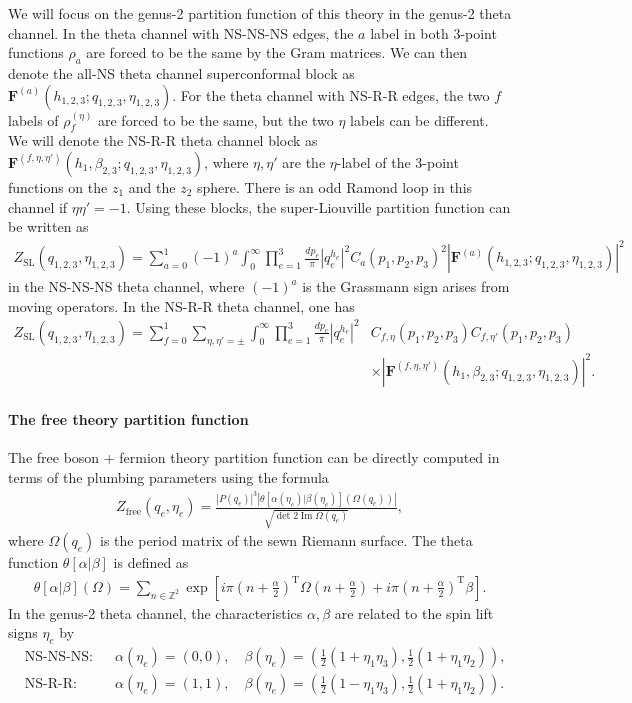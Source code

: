 \documentclass[12pt]{article}
\def\ie{\begin{equation}\begin{aligned}}
\def\fe{\end{aligned}\end{equation}}
\begin{document}
\begin{appendix}
We will focus on the genus-2 partition function of this theory in the genus-2 theta channel. In the theta channel with NS-NS-NS edges, the $a$ label in both 3-point functions $\rho_a$ are forced to be the same by the Gram matrices. We can then denote the all-NS theta channel superconformal block as $\mathbf{F}^{(a)}(h_{1,2,3};q_{1,2,3},\eta_{1,2,3})$. For the theta channel with NS-R-R edges, the two $f$ labels of $\rho^{(\eta)}_f$ are forced to be the same, but the two $\eta$ labels can be different. We will denote the NS-R-R theta channel block as $\mathbf{F}^{(f,\eta,\eta')}(h_1, \beta_{2,3};q_{1,2,3},\eta_{1,2,3})$, where $\eta, \eta'$ are the $\eta$-label of the 3-point functions on the $z_1$ and the $z_2$ sphere. There is an odd Ramond loop in this channel if $\eta \eta'=-1$. Using these blocks, the super-Liouville partition function can be written as
\ie
Z_{\mathrm{SL}}(q_{1,2,3}, \eta_{1,2,3}) = \sum_{a=0}^1 (-1)^a \int_0^\infty \prod_{e=1}^3 \frac{dp_e}{\pi} |q_e^{h_e}|^2 C_a(p_1,p_2,p_3)^2 |\mathbf{F}^{(a)}(h_{1,2,3};q_{1,2,3},\eta_{1,2,3})|^2
\fe
in the NS-NS-NS theta channel, where $(-1)^a$ is the Grassmann sign arises from moving operators. In the NS-R-R theta channel, one has
\ie
Z_{\mathrm{SL}}(q_{1,2,3}, \eta_{1,2,3}) = \sum_{f=0}^1\sum_{\eta,\eta'=\pm} \int_0^\infty \prod_{e=1}^3 \frac{dp_e}{\pi} |q_e^{h_e}|^2 &C_{f,\eta}(p_1,p_2,p_3)C_{f,\eta'}(p_1,p_2,p_3)\\
&\times |\mathbf{F}^{(f,\eta, \eta')}(h_{1},\beta_{2,3};q_{1,2,3},\eta_{1,2,3})|^2.
\fe

\paragraph{The free theory partition function} The free boson + fermion theory partition function can be directly computed in terms of the plumbing parameters using the formula \cite{Yin:2007gv}
\ie
Z_{\mathrm{free}}(q_e, \eta_e) = \frac{|P(q_e)|^3 \left|\theta[\alpha(\eta_e)| \beta(\eta_e)](\Omega(q_e))\right|}{\sqrt{\det 2 \operatorname{Im}\Omega(q_e)}},
\fe
where $\Omega(q_e)$ is the period matrix of the sewn Riemann surface. The theta function $\theta[\alpha|\beta]$ is defined as
\ie
\theta[\alpha|\beta](\Omega) = \sum_{n\in \mathbb{Z}^2}\exp\left[i\pi(n+\tfrac{\alpha}{2})^\mathrm{T}\Omega(n+\tfrac{\alpha}{2})+i\pi(n+\tfrac{\alpha}{2})^\mathrm{T}\beta\right].
\fe
In the genus-2 theta channel, the characteristics $\alpha, \beta$ are related to the spin lift signs $\eta_e$ by
\ie
&\text{NS-NS-NS:}\quad &\alpha(\eta_e) = (0,0),\quad \beta(\eta_e)=\left(\tfrac{1}{2}(1+\eta_1\eta_3),\tfrac{1}{2}(1+\eta_1\eta_2)\right),\\
&\text{NS-R-R:}\quad &\alpha(\eta_e) = (1,1),\quad \beta(\eta_e)=\left(\tfrac{1}{2}(1-\eta_1\eta_3),\tfrac{1}{2}(1+\eta_1\eta_2)\right).
\fe


\end{appendix}
\end{document}
